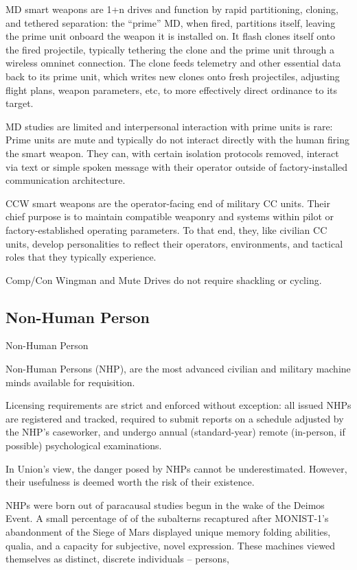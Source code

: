 MD smart weapons are 1+n drives and function by rapid partitioning, cloning, and tethered
separation: the “prime” MD, when fired, partitions itself, leaving the prime unit onboard the
weapon it is installed on. It flash clones itself onto the fired projectile, typically tethering the clone
and the prime unit through a wireless omninet connection. The clone feeds telemetry and other
essential data back to its prime unit, which writes new clones onto fresh projectiles, adjusting
flight plans, weapon parameters, etc, to more effectively direct ordinance to its target.


MD studies are limited and interpersonal interaction with prime units is rare: Prime units are mute
and typically do not interact directly with the human firing the smart weapon. They can, with
certain isolation protocols removed, interact via text or simple spoken message with their
operator outside of factory-installed communication architecture.


CCW smart weapons are the operator-facing end of military CC units. Their chief purpose is to
maintain compatible weaponry and systems within pilot or factory-established operating
parameters. To that end, they, like civilian CC units, develop personalities to reflect their
operators, environments, and tactical roles that they typically experience.


Comp/Con Wingman and Mute Drives do not require shackling or cycling.

\subsection{Non-Human Person}
Non-Human Person

Non-Human Persons (NHP), are the most advanced civilian and military machine minds available
for requisition.


Licensing requirements are strict and enforced without exception: all issued NHPs are registered
and tracked, required to submit reports on a schedule adjusted by the NHP’s caseworker, and
undergo annual (standard-year) remote (in-person, if possible) psychological examinations.


In Union’s view, the danger posed by NHPs cannot be underestimated. However, their usefulness
is deemed worth the risk of their existence.


NHPs were born out of paracausal studies begun in the wake of the Deimos Event. A small
percentage of of the subalterns recaptured after MONIST-1’s abandonment of the Siege of Mars
displayed unique memory folding abilities, qualia, and a capacity for subjective, novel
expression. These machines viewed themselves as distinct, discrete individuals -- persons,




